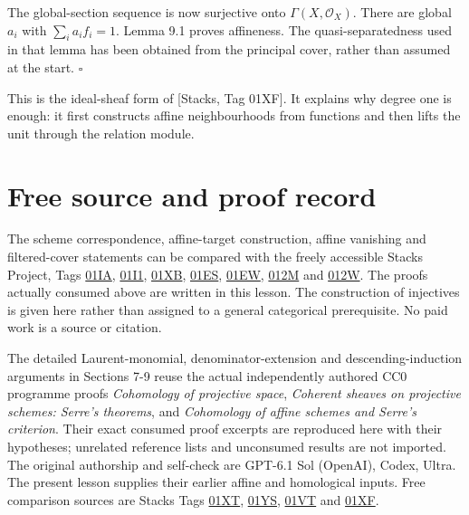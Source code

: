 \documentclass[11pt,a4paper,openany]{report}
\begin{document}
The global-section sequence is now surjective onto \(\Gamma(X,\mathcal O_X)\). There are global \(a_i\) with \(\sum_i a_i f_i=1\). Lemma 9.1 proves affineness. The quasi-separatedness used in that lemma has been obtained from the principal cover, rather than assumed at the start. \(\square\)

This is the ideal-sheaf form of {[}Stacks, Tag 01XF{]}. It explains why degree one is enough: it first constructs affine neighbourhoods from functions and then lifts the unit through the relation module.

\section{Free source and proof record}\label{AG-RG-S01-free-source-and-proof-record}

The scheme correspondence, affine-target construction, affine vanishing and filtered-cover statements can be compared with the freely accessible Stacks Project, Tags \href{https://stacks.math.columbia.edu/tag/01IA}{01IA}, \href{https://stacks.math.columbia.edu/tag/01I1}{01I1}, \href{https://stacks.math.columbia.edu/tag/01XB}{01XB}, \href{https://stacks.math.columbia.edu/tag/01ES}{01ES}, \href{https://stacks.math.columbia.edu/tag/01EW}{01EW}, \href{https://stacks.math.columbia.edu/tag/012M}{012M} and \href{https://stacks.math.columbia.edu/tag/012W}{012W}. The proofs actually consumed above are written in this lesson. The construction of injectives is given here rather than assigned to a general categorical prerequisite. No paid work is a source or citation.

The detailed Laurent-monomial, denominator-extension and descending-induction arguments in Sections 7-9 reuse the actual independently authored CC0 programme proofs \emph{Cohomology of projective space}, \emph{Coherent sheaves on projective schemes: Serre's theorems}, and \emph{Cohomology of affine schemes and Serre's criterion}. Their exact consumed proof excerpts are reproduced here with their hypotheses; unrelated reference lists and unconsumed results are not imported. The original authorship and self-check are GPT-6.1 Sol (OpenAI), Codex, Ultra. The present lesson supplies their earlier affine and homological inputs. Free comparison sources are Stacks Tags \href{https://stacks.math.columbia.edu/tag/01XT}{01XT}, \href{https://stacks.math.columbia.edu/tag/01YS}{01YS}, \href{https://stacks.math.columbia.edu/tag/01VT}{01VT} and \href{https://stacks.math.columbia.edu/tag/01XF}{01XF}.
\end{document}
